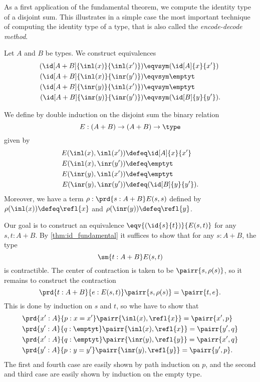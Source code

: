 As a first application of the fundamental theorem, we compute the identity type of a disjoint sum.
This illustrates in a simple case the most important technique of computing the identity type of a type, that is also called the \emph{encode-decode method}.

\begin{defn}
Let $A$ and $B$ be types. We construct equivalences
\begin{align*}
(\id[A+B]{\inl(x)}{\inl(x')}) & \eqvsym (\id[A]{x}{x'}) \\
(\id[A+B]{\inl(x)}{\inr(y')}) & \eqvsym \emptyt \\
(\id[A+B]{\inr(y)}{\inl(x')}) & \eqvsym \emptyt \\
(\id[A+B]{\inr(y)}{\inr(y')}) & \eqvsym (\id[B]{y}{y'}).
\end{align*}
\end{defn}

\begin{constr}
We define by double induction on the disjoint sum the binary relation
\begin{equation*}
E : (A+B)\to (A+B)\to\type
\end{equation*}
given by
\begin{align*}
E({\inl(x)},{\inl(x')}) & \defeq \id[A]{x}{x'} \\
E({\inl(x)},{\inr(y')}) & \defeq \emptyt \\
E({\inr(y)},{\inl(x')}) & \defeq \emptyt \\
E({\inr(y)},{\inr(y')}) & \defeq (\id[B]{y}{y'}).
\end{align*}
Moreover, we have a term $\rho:\prd{s:A+B}E(s,s)$ defined by $\rho(\inl(x))\defeq\refl{x}$ and $\rho(\inr(y))\defeq\refl{y}$.

Our goal is to construct an equivalence $\eqv{(\id{s}{t})}{E(s,t)}$ for any $s,t:A+B$. 
By \autoref{thm:id_fundamental} it suffices to show that for any $s:A+B$, the type
\begin{equation*}
\sm{t:A+B}E(s,t)
\end{equation*}
is contractible. The center of contraction is taken to be $\pairr{s,\rho(s)}$, so it remains to construct the contraction
\begin{equation*}
\prd{t:A+B}{e:E(s,t)} \pairr{s,\rho(s)}=\pairr{t,e}.
\end{equation*}
This is done by induction on $s$ and $t$, so whe have to show that
\begin{align*}
& \prd{x':A}{p:x=x'} \pairr{\inl(x),\refl{x}}=\pairr{x',p} \\
& \prd{y':A}{q:\emptyt} \pairr{\inl(x),\refl{x}}=\pairr{y',q} \\
& \prd{x':A}{q:\emptyt} \pairr{\inr(y),\refl{y}}=\pairr{x',q} \\
& \prd{y':A}{p:y=y'} \pairr{\inr(y),\refl{y}}=\pairr{y',p}.
\end{align*}
The first and fourth case are easily shown by path induction on $p$, and the second and third case are easily shown by induction on the empty type.
\end{constr}

